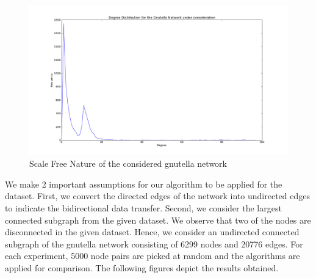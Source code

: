 \documentclass[a4paper,12pt]{article}
\begin{document}
\begin{figure}[htp]
\centering
\includegraphics[scale=0.3]{Results/gnutellaNetwork.png}
\caption{Scale Free Nature of the considered gnutella network}
\label{gnutellaNetwork}
\end{figure}

We make 2 important assumptions for our algorithm to be applied for the dataset. First, we convert the directed edges of the network into undirected edges to indicate the bidirectional data transfer. Second, we consider the largest connected subgraph from the given dataset. We observe that two of the nodes are disconnected in the given dataset. Hence, we consider an undirected connected subgraph of the gnutella network consisting of 6299 nodes and 20776 edges. For each experiment, 5000 node pairs are picked at random and the algorithms are applied for comparison. The following figures depict the results obtained.

\newpage
\end{document}
